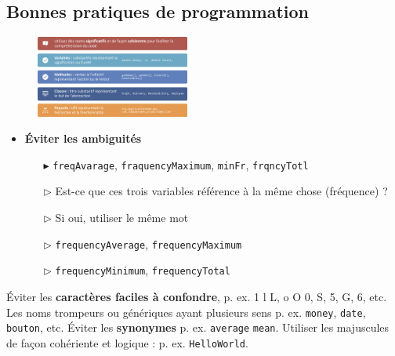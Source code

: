 \documentclass[16pt]{report}
\begin{document}
\begin{multicols*}{2}
        \section{Bonnes pratiques de programmation}

    \begin{figure}[H]
        \begin{center}
            \includegraphics[width=0.45\textwidth]{BonnesPraiquesProg.png}
        \end{center}
    \end{figure}


    \begin{itemize}
        \item \textbf{Éviter les ambiguités}  
            \begin{itemize}
                \item[$\blacktriangleright$] \texttt{freqAvarage}, \texttt{fraquencyMaximum}, \texttt{minFr}, 
                    \texttt{frqncyTotl} 
                \item[$\rhd$] Est-ce que ces trois variables référence à la même chose (fréquence) ?
                \item[$\rhd$] Si oui, utiliser le même mot 
                \item[$\rhd$] \texttt{frequencyAverage}, 
                    \texttt{frequencyMaximum}
                \item[$\rhd$] \texttt{frequencyMinimum}, \texttt{frequencyTotal}  
            \end{itemize}
    \end{itemize}

    Éviter les \textbf{caractères faciles à confondre}, p. ex. 1 l L, o O 0, S, 5, G, 6, etc. Les 
    \textcolor{myb}{noms trompeurs} ou \textcolor{myb}{génériques} ayant plusieurs sens p. ex. 
    \texttt{money}, \texttt{date}, \texttt{bouton}, etc. Éviter les \textbf{synonymes} p. ex.  
    \texttt{average} \texttt{mean}. Utiliser les majuscules de façon cohériente et logique : p. ex. 
    \texttt{HelloWorld}.  



\end{multicols*}
\end{document}
